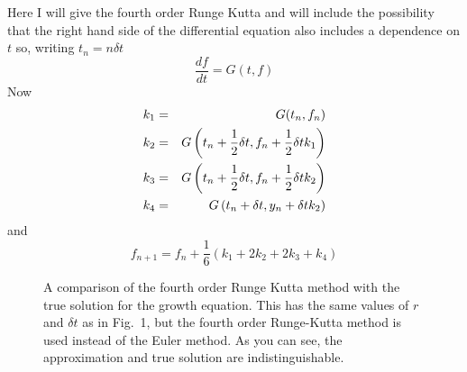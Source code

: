 \documentclass[12pt]{article}
\begin{document}
Here I will give the fourth order Runge Kutta and will include the
possibility that the right hand side of the differential equation also
includes a dependence on $t$ so, writing $t_n=n\delta t$
\begin{equation}
\frac{df}{dt}=G(t,f)
\end{equation}
Now
\begin{eqnarray}
k_1&=&G(t_n,f_n)\cr
k_2&=&G\left(t_n+\frac{1}{2}\delta t,f_n+\frac{1}{2}\delta tk_1\right)\cr 
k_3&=&G\left(t_n+\frac{1}{2}\delta t,f_n+\frac{1}{2}\delta tk_2\right)\cr 
k_4&=&G\left(t_n+\delta t,y_n+\delta tk_2\right) 
\end{eqnarray}
and 
\begin{equation}
f_{n+1}=f_n+\frac{1}{6}(k_1+2k_2+2k_3+k_4)
\end{equation}

\begin{figure}
\begin{center}

\end{center}
\caption{A comparison of the fourth order Runge Kutta method with the
  true solution for the growth equation. This has the same values of
  $r$ and $\delta t$ as in Fig.~1, but the fourth order Runge-Kutta
  method is used instead of the Euler method. As you can see, the
  approximation and true solution are indistinguishable.}
\end{figure}
\end{document}
